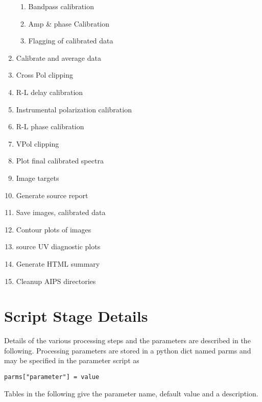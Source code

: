 \documentclass[11pt]{article}
\begin{document}
\begin{enumerate}
\begin{enumerate}
\item Bandpass calibration
\item Amp \& phase Calibration 
\item Flagging of calibrated data
\end{enumerate}
\item Calibrate and average data
\item Cross Pol clipping
\item R-L  delay calibration
\item Instrumental polarization calibration
\item R-L phase calibration
\item VPol clipping
\item Plot final calibrated spectra 
\item Image targets
\item Generate source report
\item Save images, calibrated data
\item Contour plots of images
\item source UV diagnostic plots
\item Generate HTML summary
\item Cleanup AIPS directories
\end{enumerate}

\section{Script Stage Details}\label{Details}
Details of the various processing steps and the parameters are
described in the following.
Processing parameters are stored in a python dict named parms and may
be specified in the parameter script as
\begin{verbatim}
parms["parameter"] = value
\end{verbatim}
Tables in the following give the parameter name, default value and a
description.
\end{document}
